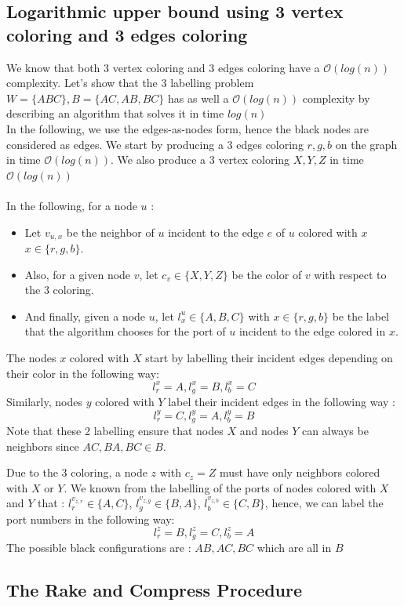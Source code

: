 \subsection{Logarithmic upper bound using 3 vertex coloring and 3 edges coloring}
We know that both 3 vertex coloring and 3 edges coloring have a $\mathcal{O}(log(n))$ complexity. Let's show that the 3 labelling problem $W = \{ABC\}, B = \{AC, AB, BC\}$ has as well a $\mathcal{O}(log(n))$ complexity by describing an algorithm that solves it in time $log(n)$\\
In the following, we use the edges-as-nodes form, hence the black nodes are considered as edges.
We start by producing a 3 edges coloring $r,g,b$ on the graph in time $\mathcal{O}(log(n))$.
We also produce a 3 vertex coloring $X,Y,Z$ in time $\mathcal{O}(log(n))$\\\\
In the following, for a node $u$ :
\begin{itemize}
    \item Let $v_{u,x}$ be the neighbor of $u$ incident to the edge $e$ of $u$ colored with $x$ $x\in\{r,g,b\}$.
    \item Also, for a given node $v$, let $c_v\in\{X,Y,Z\}$ be the color of $v$ with respect to the 3 coloring.
    \item And finally, given a node $u$, let $l^u_{x}\in\{A,B,C\}$ with $x\in\{r,g,b\}$ be the label that the algorithm chooses for the port of $u$ incident to the edge colored in $x$.

\end{itemize}
The nodes $x$ colored with $X$ start by labelling their incident edges depending on their color in the following way: $$l^{x}_r = A , l^{x}_g = B, l^{x}_{b} = C$$
Similarly, nodes $y$ colored with $Y$ label their incident edges in the following way : $$l^{y}_r = C, l^{y}_{g} = A, l^{y}_b = B$$
Note that these 2 labelling ensure that nodes $X$ and nodes $Y$ can always be neighbors since $AC,BA,BC\in B$.

Due to the 3 coloring, a node $z$ with $c_z = Z$ must have only neighbors colored with $X$ or $Y$. We known from the labelling of the ports of nodes colored with $X$ and $Y$ that : $l^{v_{z,r}}_{r}\in \{A,C\}$, $l^{v_{z,g}}_{g}\in \{B,A\}$, $l^{v_{z,b}}_{b}\in \{C,B\}$, hence, we can label the port numbers in the following way:
$$l^{z}_r = B , l^{z}_g = C, l^{z}_{b} = A$$
The possible black configurations are : $AB,AC,BC$ which are all in $B$


\subsection{The Rake and Compress Procedure}
